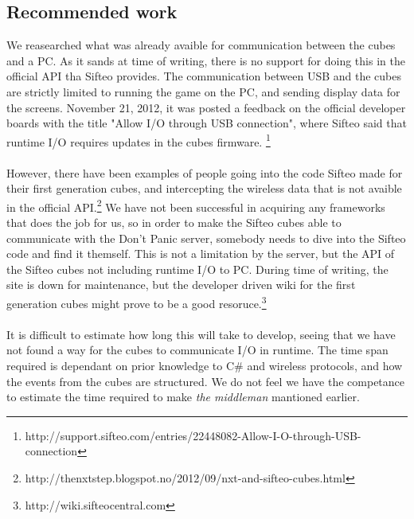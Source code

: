 

\subsection{Recommended work}

We reasearched what was already avaible for communication between the cubes and a PC. As it sands at time of writing, there is no support for doing this in the official API tha Sifteo provides. The communication between USB and the cubes are strictly limited to running the game on the PC, and sending display data for the screens. November 21, 2012, it was posted a feedback on the official developer boards with the title "Allow I/O through USB connection", where Sifteo said that runtime I/O requires updates in the cubes firmware.
\footnote{http://support.sifteo.com/entries/22448082-Allow-I-O-through-USB-connection}\\
\\
However, there have been examples of people going into the code Sifteo made for their first generation cubes, and intercepting the wireless data that is not avaible in the official API.\footnote{http://thenxtstep.blogspot.no/2012/09/nxt-and-sifteo-cubes.html} 
We have not been successful in acquiring any frameworks that does the job for us, so in order to make the Sifteo cubes able to communicate with the Don't Panic server, somebody needs to dive into the Sifteo code and find it themself. This is not a limitation by the server, but the API of the Sifteo cubes not including runtime I/O to PC. During time of writing, the site is down for maintenance, but the developer driven wiki for the first generation cubes might prove to be a good resoruce.\footnote{http://wiki.sifteocentral.com}\\
\\
It is difficult to estimate how long this will take to develop, seeing that we have not found a way for the cubes to communicate I/O in runtime. The time span required is dependant on prior knowledge to C\# and wireless protocols, and how the events from the cubes are structured. We do not feel we have the competance to estimate the time required to make \emph{the middleman} mantioned earlier.\\

